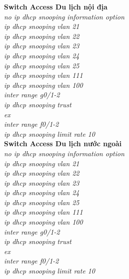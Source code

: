\documentclass[12pt,a4paper]{report}
\begin{document}
\hspace*{1cm}\textbf{Switch Access Du lịch nội địa}\\
\hspace*{2cm}\textit{no ip dhcp snooping information option\\
\hspace*{2cm}ip dhcp snooping vlan 21\\
\hspace*{2cm}ip dhcp snooping vlan 22\\
\hspace*{2cm}ip dhcp snooping vlan 23\\
\hspace*{2cm}ip dhcp snooping vlan 24\\
\hspace*{2cm}ip dhcp snooping vlan 25\\
\hspace*{2cm}ip dhcp snooping vlan 111\\
\hspace*{2cm}ip dhcp snooping vlan 100\\
\hspace*{2cm}inter range g0/1-2\\
\hspace*{2cm}ip dhcp snooping trust\\
\hspace*{2cm}ex\\
\hspace*{2cm}inter range f0/1-2\\
\hspace*{2cm}ip dhcp snooping limit rate 10\\}
\hspace*{1cm}\textbf{Switch Access Du lịch nước ngoài}\\
\hspace*{2cm}\textit{no ip dhcp snooping information option\\
\hspace*{2cm}ip dhcp snooping vlan 21\\
\hspace*{2cm}ip dhcp snooping vlan 22\\
\hspace*{2cm}ip dhcp snooping vlan 23\\
\hspace*{2cm}ip dhcp snooping vlan 24\\
\hspace*{2cm}ip dhcp snooping vlan 25\\
\hspace*{2cm}ip dhcp snooping vlan 111\\
\hspace*{2cm}ip dhcp snooping vlan 100\\
\hspace*{2cm}inter range g0/1-2\\
\hspace*{2cm}ip dhcp snooping trust\\
\hspace*{2cm}ex\\
\hspace*{2cm}inter range f0/1-2\\
\hspace*{2cm}ip dhcp snooping limit rate 10\\}
\end{document}
